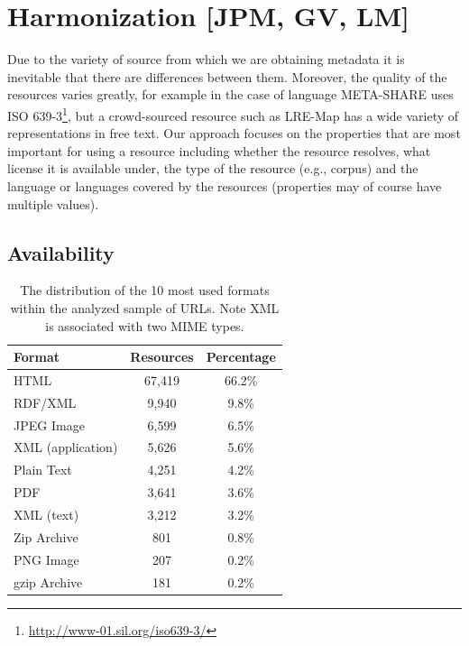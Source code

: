 \documentclass[smallextended]{svjour3}       %
\begin{document}
\section{Harmonization [JPM, GV, LM]}

\label{harmonization}

Due to the variety of source from which we are obtaining metadata it is
inevitable that there are differences between them. Moreover, the quality of the
resources varies greatly, for example in the case of language META-SHARE uses
ISO 639-3\footnote{\url{http://www-01.sil.org/iso639-3/}}, but a crowd-sourced
resource such as LRE-Map has a wide variety of representations in free text. Our
approach focuses on the properties that are most important for using a resource
including whether the resource resolves, what license it is available under, the
type of the resource (e.g., corpus) and the language or languages covered by the
resources (properties may of course have multiple values).

\subsection{Availability}

\begin{table}
    \begin{center}
	\begin{tabular}{l|cc}
            Format   & Resources  & Percentage\\
		
		\hline                                              
                HTML                &	67,419 & 66.2\%\\
                RDF/XML             &	9,940  & 9.8\% \\
                JPEG Image          &   6,599  & 6.5\% \\
                XML (application)   &	5,626  & 5.6\% \\
                Plain Text          & 4,251    & 4.2\% \\
                PDF                 &	3,641  & 3.6\% \\
                XML (text)          & 3,212    & 3.2\% \\
                Zip Archive         &	801    & 0.8\% \\
                PNG Image           & 207      & 0.2\% \\
                gzip Archive        & 181      & 0.2\% \\
	\end{tabular}
    \end{center}
	\caption{\label{tab:formats}The distribution of the 10 most used formats within the
        analyzed sample of URLs. Note XML is associated with two MIME types.}
\end{table}
\end{document}
